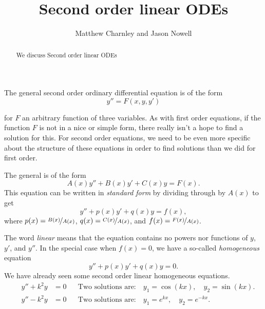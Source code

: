 \documentclass{ximera}
\title{Second order linear ODEs}
\author{Matthew Charnley and Jason Nowell}
\begin{document}
\begin{abstract}
    We discuss Second order linear ODEs
\end{abstract}
\maketitle

\label{solinear:section}



The general second order ordinary differential equation is of the form 
\begin{equation*}
    y'' = F(x, y, y')
\end{equation*} 

for $F$ an arbitrary function of three variables. As with first order equations, if the function $F$ is not in a nice or simple form, there really isn't a hope to find a solution for this. For second order equations, we need to be even more specific about the structure of these equations in order to find solutions than we did for first order.


\begin{definition}
    The general \emph{} is of the form
    \begin{equation*}
        A(x) y'' + B(x)y' + C(x)y = F(x) .
    \end{equation*}
    This equation can be written in \emph{standard form} by dividing through by $A(x)$ to get
    \begin{equation} \label{sol:eqlin}
        y'' + p(x)y' + q(x)y = f(x) ,
    \end{equation}
    where $p(x) = \nicefrac{B(x)}{A(x)}$, $q(x) = \nicefrac{C(x)}{A(x)}$, and $f(x) = \nicefrac{F(x)}{A(x)}$.
\end{definition}

The word \emph{linear} means that the equation contains no powers nor functions of $y$, $y'$, and $y''$. In the special case when $f(x) = 0$, we have a so-called \emph{homogeneous} equation
\begin{equation} \label{sol:eqlinhom}
    y'' + p(x)y' + q(x)y = 0 .
\end{equation}
We have already seen some second order linear homogeneous equations.
\begin{align*}
    \qquad y'' + k^2 y & = 0 & & \text{Two solutions are:} \quad y_1 = \cos (kx), \quad y_2 = \sin(kx) . \qquad \\
    \qquad y'' - k^2 y & = 0 & & \text{Two solutions are:} \quad y_1 = e^{kx}, \quad y_2 = e^{-kx} . \qquad
\end{align*}
\end{document}
